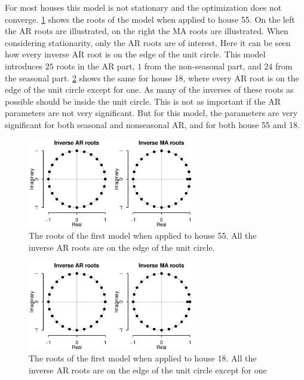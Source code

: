 \noindent For most houses this model is not stationary and the optimization does not converge. \cref{fig:Model1_stationarity} shows the roots of the model when applied to house 55. On the left the AR roots are illustrated, on the right the MA roots are illustrated. When considering stationarity, only the AR roots are of interest. Here it can be seen how every inverse AR root is on the edge of the unit circle. This model introduces $25$ roots in the AR part, $1$ from the non-seasonal part, and $24$ from the seasonal part. \cref{fig:Model1_stationarity18} shows the same for house 18, where every AR root is on the edge of the unit circle except for one. As many of the inverses of these roots as possible should be inside the unit circle. This is not as important if the AR parameters are not very significant. But for this model, the parameters are very significant for both seasonal and nonseasonal AR, and for both house 55 and 18. 
    \begin{figure}[ht]
        \centering
        \includegraphics[width=0.65\textwidth]{../../../figures/arimax/Stationarity_model1.eps}
        \caption{The roots of the first model when applied to house 55. All the inverse AR roots are on the edge of the unit circle.}
        \label{fig:Model1_stationarity}
    \end{figure}
    \begin{figure}
        \centering
        \includegraphics[width=0.65\textwidth]{../../../figures/arimax/Stationarity_model1_18.eps}
        \caption{The roots of the first model when applied to house 18. All the inverse AR roots are on the edge of the unit circle except for one}
        \label{fig:Model1_stationarity18}
    \end{figure}
